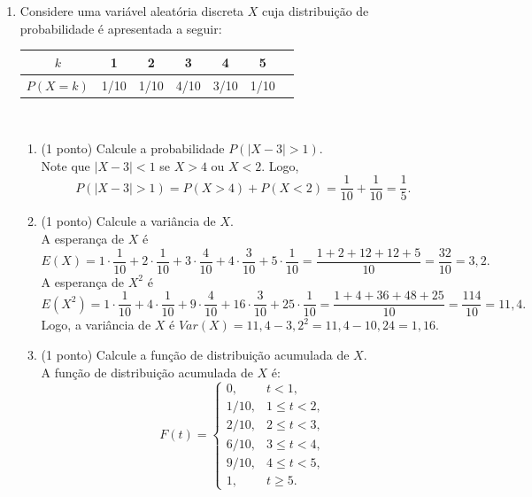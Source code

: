 \documentclass{article}
\begin{document}
\begin{enumerate}



% 
\item Considere uma variável aleatória discreta $X$ cuja distribuição de probabilidade é apresentada a seguir:
    \begin{center}
    \begin{tabular}{c|cccccc}
    \hline
    $k$ & 1 & 2 & 3 & 4 & 5 \\
    \hline
    $P(X=k)$ & 1/10 & 1/10 & 4/10 & 3/10 & 1/10 \\
    \hline
    \end{tabular}\\
    \end{center}
    \begin{enumerate}
    \item (1 ponto) Calcule a probabilidade $P(|X-3|>1)$.\\{\color{blue}  
	Note que $|X-3|<1$ se $X>4$ ou $X<2$. Logo,
	$$
	P(|X-3|>1) = P(X>4) + P(X<2) = \frac{1}{10} + \frac{1}{10} = \frac{1}{5}.
	$$	
	}
	
    \item (1 ponto) Calcule a variância de $X$.\\{\color{blue}  
	A esperança de $X$ é
	$$
	E(X) = 1\cdot\frac{1}{10} + 2\cdot\frac{1}{10} + 3\cdot\frac{4}{10} + 4\cdot\frac{3}{10} + 5\cdot\frac{1}{10}
	= \frac{1 + 2 +12 + 12 + 5}{10} = \frac{32}{10} = 3,2.
	$$
	A esperança de $X^2$ é
	$$
	E(X^2) = 1\cdot\frac{1}{10} + 4\cdot\frac{1}{10} + 9\cdot\frac{4}{10} + 16\cdot\frac{3}{10} + 25\cdot\frac{1}{10}
	= \frac{1 + 4 + 36 + 48 + 25}{10} = \frac{114}{10} = 11,4.
	$$
	Logo, a variância de $X$ é $Var(X) = 11,4 - 3,2^2 = 11,4 - 10,24 = 1,16$.
	}
	
    \item (1 ponto) Calcule a função de distribuição acumulada de $X$.\\{\color{blue}  
	A função de distribuição acumulada de $X$ é:
	$$
	F(t) = \begin{cases}
	0, & t<1, \\
	1/10, & 1\leq t<2, \\
	2/10, & 2\leq t<3, \\
	6/10, & 3\leq t<4, \\
	9/10, & 4\leq t<5, \\
	1, & t \geq 5 .
	\end{cases}
	$$	
	}
    \end{enumerate}


\end{enumerate}
\end{document}
